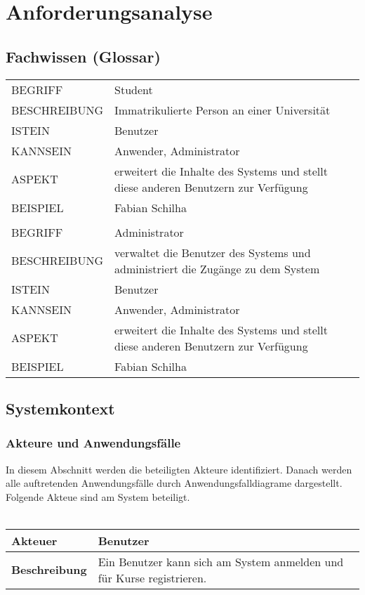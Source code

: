 \documentclass[12pt,a4paper]{article}
\begin{document}
\section{Anforderungsanalyse}
\subsection{Fachwissen (Glossar)}
\begin{tabular}{l l} 
BEGRIFF & Student \\ 
BESCHREIBUNG & Immatrikulierte Person an einer Universität \\ 
ISTEIN & Benutzer \\
KANNSEIN & Anwender, Administrator \\ 
ASPEKT & erweitert die Inhalte des Systems und stellt diese anderen Benutzern zur Verfügung \\
BEISPIEL & Fabian Schilha\\

&\\ 

BEGRIFF & Administrator \\ 
BESCHREIBUNG & verwaltet die Benutzer des Systems und administriert die Zugänge zu dem System \\ 
ISTEIN & Benutzer \\
KANNSEIN & Anwender, Administrator \\ 
ASPEKT & erweitert die Inhalte des Systems und stellt diese anderen Benutzern zur Verfügung \\
BEISPIEL & Fabian Schilha\\
\end{tabular}


\subsection{Systemkontext}
\subsubsection{Akteure und Anwendungsfälle}
In diesem Abschnitt werden die beteiligten Akteure identifiziert. Danach werden alle auftretenden Anwendungsfälle durch Anwendungsfalldiagrame dargestellt.
Folgende Akteue sind am System beteiligt.\\\\

\begin{tabular}{l p{10cm}}
\hline \textbf{Akteuer} & Benutzer \\ 
\hline \textbf{Beschreibung} & Ein Benutzer kann sich am System anmelden und für Kurse registrieren. \\ 
\hline 
\end{tabular}\\\\
\end{document}
